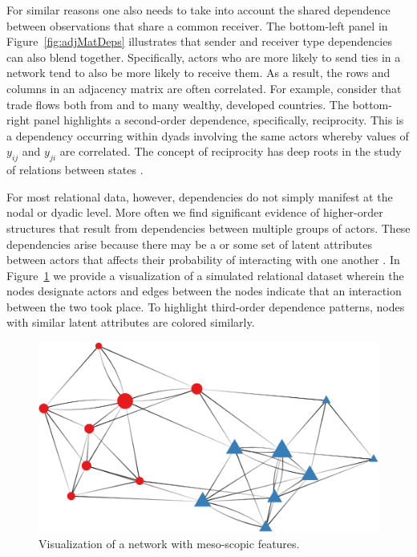For similar reasons one also needs to take into account the shared dependence between observations that share a common receiver. The bottom-left panel in Figure~\ref{fig:adjMatDeps} illustrates that sender and receiver type dependencies can also blend together. Specifically, actors who are more likely to send ties in a network tend to also be more likely to receive them. As a result, the rows and columns in an adjacency matrix are often correlated. For example, consider that trade flows both from and to many wealthy, developed countries. The bottom-right panel highlights a second-order dependence, specifically, reciprocity. This is a dependency occurring within dyads involving the same actors whereby values of $y_{ij}$ and $y_{ji}$ are correlated. The concept of reciprocity has deep roots in the study of relations between states \citep{richardson:1960,keohane:1989}.

For most relational data, however, dependencies do not simply manifest at the nodal or dyadic level. More often we find significant evidence of higher-order structures that result from dependencies between multiple groups of actors. These dependencies arise because there may be a or some set of latent attributes between actors that affects their probability of interacting with one another \citep{zinnes:1967,wasserman:faust:1994}. In Figure~\ref{fig:thirdDeps} we provide a visualization of a simulated relational dataset wherein the nodes designate actors and edges between the nodes indicate that an interaction between the two took place. To highlight third-order dependence patterns, nodes with similar latent attributes are colored similarly.

\begin{figure}[ht]
	\includegraphics[width=.6\textwidth]{stochEquiv_v2.pdf}
	\caption{Visualization of a network with meso-scopic features.}
	\label{fig:thirdDeps}
\end{figure}

